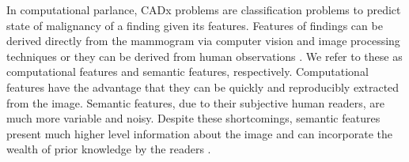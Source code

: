 In computational parlance, CADx problems are classification problems to predict state of malignancy of a finding given its features. Features of findings can be derived directly from the mammogram via computer vision and image processing techniques \cite{Jiang:1999fj,Jiang:2001fy, Giger:2013jb, Eadie:2011cv} or they can be derived from human observations \cite{ElizabethS:2005gc, Burnside:2000wl, Rubin:2005jg}. We refer to these as computational features and semantic features, respectively. Computational features have the advantage that they can be quickly and reproducibly extracted from the image. Semantic features, due to their subjective human readers, are much more variable and noisy. Despite these shortcomings, semantic features present much higher level information about the image and can incorporate the wealth of prior knowledge by the readers \cite{Liberman:ws,Elter:2009fv}.

